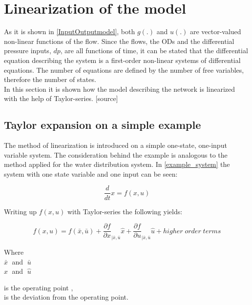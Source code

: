 \section{Linearization of the model} 
\label{LinParamEst}

As it is shown in \eqref{InputOutputmodel}, both $g(.)$ and $u(.)$ are vector-valued non-linear functions of the flow. Since the flows, the ODs and the differential pressure inputs, $dp$, are all functions of time, it can be stated that the differential equation describing the system is a first-order non-linear systems of differential equations. The number of equations are defined by the number of free variables, therefore the number of states.
\\
In this section it is shown how the model describing the network is linearized with the help of Taylor-series. [source] 

\subsection{Taylor expansion on a simple example}
 \label{Taylorexamplesection}

The method of linearization is introduced on a simple one-state, one-input variable system. The consideration behind the example is analogous to the method applied for the water distribution system. In \eqref{example_system} the system with one state variable and one input can be seen: 

\begin{equation}
\frac{d}{dt} x = f(x,u)
 \label{example_system}
\end{equation}

Writing up $f(x,u)$ with Taylor-series the following yields: 

\begin{equation}
f(x,u) = f(\bar{x},\bar{u}) + \frac{\partial f}{\partial x}_{|\bar{x}, \bar{u}} \hat{x} + \frac{\partial f}{\partial u}_{|\bar{x}, \bar{u}} \hat{u} + higher \; order \; terms  
 \label{TaylorExpansion}
\end{equation}

\begin{minipage}[t]{0.20\textwidth}
Where\\
\hspace*{8mm} $\bar{x} \;$ and $\; \bar{u}$ \\
\hspace*{8mm} $\hat{x} \;$ and $\; \hat{u}$ 
\end{minipage}
\begin{minipage}[t]{0.68\textwidth}
\vspace*{2mm}
is the operating point ,\\
is the deviation from the operating point.
\end{minipage}


